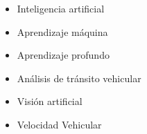 
\begin{spacing}{1.5}

\begin{itemize}

    \item Inteligencia artificial
    \item Aprendizaje máquina
    \item Aprendizaje profundo
    \item Análisis de tránsito vehicular
    \item Visión artificial
    \item Velocidad Vehicular

\end{itemize}

\end{spacing}